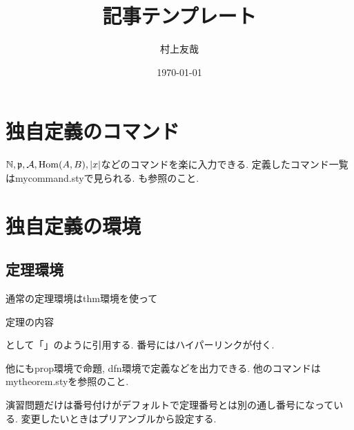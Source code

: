 \documentclass[11pt,a4paper,oneside,lualatex]{ltjsarticle} %
\numberwithin{equation}{section} %
\begin{document}

\title{記事テンプレート}
\author{村上友哉}
\date{\today}

\maketitle

\tableofcontents


\section{独自定義のコマンド} \label{sec:command}


$ \mathbb{N}, \mathfrak{p}, \mathcal{A}, \operatorname{Hom}(A, B), \left\lvert x\right\rvert $などのコマンドを楽に入力できる.
定義したコマンド一覧は\mbox{mycommand.sty}で見られる.
も参照のこと. 


\section{独自定義の環境} \label{sec:environment}



\subsection{定理環境} \label{subsec:thm}


通常の定理環境はthm環境を使って
\begin{thm}[見出し] \label{thm:1}
	定理の内容
\end{thm}
として「」のように引用する.
番号にはハイパーリンクが付く.

他にもprop環境で命題, dfn環境で定義などを出力できる.
他のコマンドはmytheorem.styを参照のこと.

\begin{exc}
	演習問題だけは番号付けがデフォルトで定理番号とは別の通し番号になっている.
	変更したいときはプリアンブルから設定する.
\end{exc}
\end{document}
